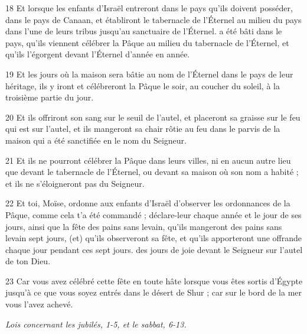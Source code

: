 \par 18 Et lorsque les enfants d'Israël entreront dans le pays qu'ils doivent posséder, dans le pays de Canaan, et établiront le tabernacle de l'Éternel au milieu du pays dans l'une de leurs tribus jusqu'au sanctuaire de l'Éternel. a été bâti dans le pays, qu'ils viennent célébrer la Pâque au milieu du tabernacle de l'Éternel, et qu'ils l'égorgent devant l'Éternel d'année en année.
\par 19 Et les jours où la maison sera bâtie au nom de l'Éternel dans le pays de leur héritage, ils y iront et célébreront la Pâque le soir, au coucher du soleil, à la troisième partie du jour.
\par 20 Et ils offriront son sang sur le seuil de l'autel, et placeront sa graisse sur le feu qui est sur l'autel, et ils mangeront sa chair rôtie au feu dans le parvis de la maison qui a été sanctifiée en le nom du Seigneur.
\par 21 Et ils ne pourront célébrer la Pâque dans leurs villes, ni en aucun autre lieu que devant le tabernacle de l'Éternel, ou devant sa maison où son nom a habité ; et ils ne s'éloigneront pas du Seigneur.
\par 22 Et toi, Moïse, ordonne aux enfants d'Israël d'observer les ordonnances de la Pâque, comme cela t'a été commandé ; déclare-leur chaque année et le jour de ses jours, ainsi que la fête des pains sans levain, qu'ils mangeront des pains sans levain sept jours, (et) qu'ils observeront sa fête, et qu'ils apporteront une offrande chaque jour pendant ces sept jours. des jours de joie devant le Seigneur sur l'autel de ton Dieu.
\par 23 Car vous avez célébré cette fête en toute hâte lorsque vous êtes sortis d'Égypte jusqu'à ce que vous soyez entrés dans le désert de Shur ; car sur le bord de la mer vous l'avez achevé.


\par \textit{Lois concernant les jubilés, 1-5, et le sabbat, 6-13.}


